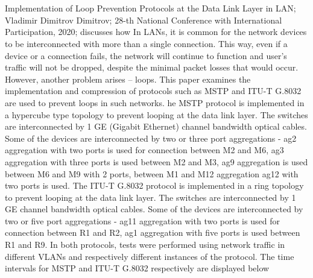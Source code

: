\documentclass[12pt]{article}
\begin{document}
\\ \\
Implementation of Loop Prevention Protocols  at the Data Link Layer in LAN; Vladimir Dimitrov Dimitrov; 28-th National Conference with International Participation, 2020; discusses how In LANs, it is common for the network devices to be  interconnected  with  more  than  a  single  connection.  This way, even if a device or a connection fails, the network will continue  to  function  and  user’s  traffic  will  not  be  dropped, despite the minimal packet losses that would occur. However, another  problem  arises – loops. This paper examines the implementation and compression of protocols  such  as  MSTP  and ITU-T  G.8032  are  used  to  prevent  loops  in  such  networks. he MSTP protocol is implemented in a hypercube type topology to prevent looping at the data link layer. The  switches  are  interconnected  by  1  GE  (Gigabit Ethernet)  channel  bandwidth  optical  cables.  Some  of  the devices  are  interconnected  by  two  or  three  port aggregations - ag2 aggregation with two ports is used for connection  between  M2  and  M6,  ag3  aggregation  with three ports is used between M2 and M3, ag9 aggregation is used between M6 and M9 with 2 ports, between M1 and M12 aggregation ag12 with two ports is used. The  ITU-T  G.8032 protocol is implemented in a ring topology to prevent looping at the data link layer. The  switches  are  interconnected  by  1  GE  channel bandwidth  optical  cables.  Some  of  the  devices  are interconnected  by  two  or  five  port  aggregations  -  ag11 aggregation with two ports is used for connection between R1 and R2, ag1 aggregation with five ports is used between R1 and R9. In both protocols, tests were performed using network traffic in different VLANs and respectively different instances of the protocol. The time intervals for MSTP and ITU-T G.8032 respectively are displayed below
\end{document}
